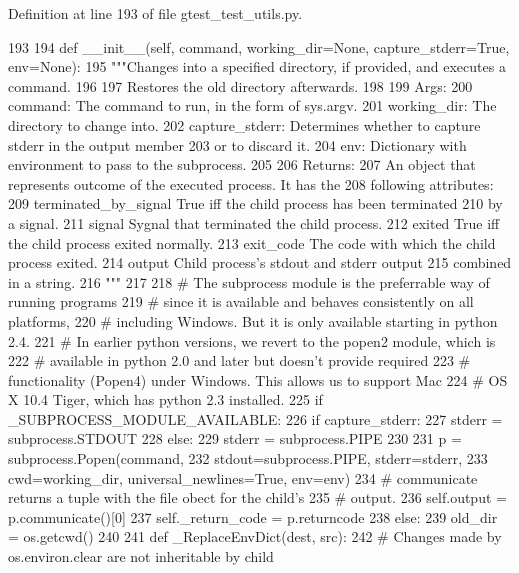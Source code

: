 \-Definition at line 193 of file gtest\-\_\-test\-\_\-utils.\-py.


\begin{DoxyCode}
193 
194   def __init__(self, command, working_dir=None, capture_stderr=True, env=None):
195     """Changes into a specified directory, if provided, and executes a command.
196 
197     Restores the old directory afterwards.
198 
199     Args:
200       command:        The command to run, in the form of sys.argv.
201       working_dir:    The directory to change into.
202       capture_stderr: Determines whether to capture stderr in the output member
203                       or to discard it.
204       env:            Dictionary with environment to pass to the subprocess.
205 
206     Returns:
207       An object that represents outcome of the executed process. It has the
208       following attributes:
209         terminated_by_signal   True iff the child process has been terminated
210                                by a signal.
211         signal                 Sygnal that terminated the child process.
212         exited                 True iff the child process exited normally.
213         exit_code              The code with which the child process exited.
214         output                 Child process's stdout and stderr output
215                                combined in a string.
216     """
217 
218     # The subprocess module is the preferrable way of running programs
219     # since it is available and behaves consistently on all platforms,
220     # including Windows. But it is only available starting in python 2.4.
221     # In earlier python versions, we revert to the popen2 module, which is
222     # available in python 2.0 and later but doesn't provide required
223     # functionality (Popen4) under Windows. This allows us to support Mac
224     # OS X 10.4 Tiger, which has python 2.3 installed.
225     if _SUBPROCESS_MODULE_AVAILABLE:
226       if capture_stderr:
227         stderr = subprocess.STDOUT
228       else:
229         stderr = subprocess.PIPE
230 
231       p = subprocess.Popen(command,
232                            stdout=subprocess.PIPE, stderr=stderr,
233                            cwd=working_dir, universal_newlines=True, env=env)
234       # communicate returns a tuple with the file obect for the child's
235       # output.
236       self.output = p.communicate()[0]
237       self._return_code = p.returncode
238     else:
239       old_dir = os.getcwd()
240 
241       def _ReplaceEnvDict(dest, src):
242         # Changes made by os.environ.clear are not inheritable by child

\end{DoxyCode}
